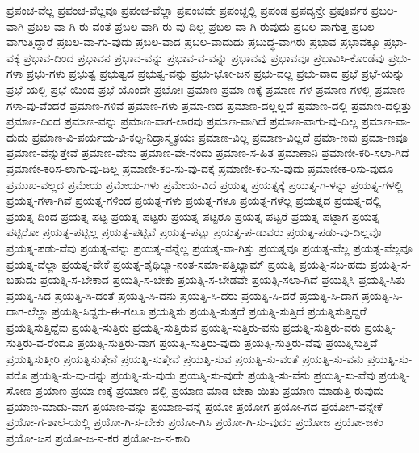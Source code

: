 {ಪ್ರಪಂಚ-ವೆಲ್ಲ
ಪ್ರಪಂಚ-ವೆಲ್ಲವೂ
ಪ್ರಪಂಚ-ವೆಲ್ಲಾ
ಪ್ರಪಂಚವೇ
ಪ್ರಪಂಚ್ದಲ್ಲಿ
ಪ್ರಪಂಡ
ಪ್ರಪದ್ಯನ್ತೇ
ಪ್ರಪೂರ್ವಕ
ಪ್ರಬಲ-ವಾಗಿ
ಪ್ರಬಲ-ವಾ-ಗಿ-ರು-ವಂತೆ
ಪ್ರಬಲ-ವಾಗಿ-ರು-ವು-ದಿಲ್ಲ
ಪ್ರಬಲ-ವಾ-ಗಿ-ರುವುದು
ಪ್ರಬಲ-ವಾಗುತ್ತ
ಪ್ರಬಲ-ವಾಗುತ್ತಿದ್ದಾರೆ
ಪ್ರಬಲ-ವಾ-ಗು-ವುದು
ಪ್ರಬಲ-ವಾದ
ಪ್ರಬಲ-ವಾದುದು
ಪ್ರಬುದ್ಧ-ವಾಗಿರು
ಪ್ರಭಾವ
ಪ್ರಭಾವಕ್ಕೂ
ಪ್ರಭಾ-ವಕ್ಕೆ
ಪ್ರಭಾವ-ದಿಂದ
ಪ್ರಭಾವನ
ಪ್ರಭಾವ-ವನ್ನು
ಪ್ರಭಾವ-ವ-ವನ್ನು
ಪ್ರಭಾವವು
ಪ್ರಭಾವವೂ
ಪ್ರಭಾವಿಸಿ-ಕೊಂಡೆವು
ಪ್ರಭು-ಗಳಾ
ಪ್ರಭು-ಗಳು
ಪ್ರಭುತ್ವ
ಪ್ರಭುತ್ವದ
ಪ್ರಭುತ್ವ-ವನ್ನು
ಪ್ರಭು-ಭೋ-ಜನ
ಪ್ರಭು-ವಲ್ಲ
ಪ್ರಭು-ವಾದ
ಪ್ರಭೆ
ಪ್ರಭೆ-ಯನ್ನು
ಪ್ರಭೆ-ಯಲ್ಲಿ
ಪ್ರಭೆ-ಯಿಂದ
ಪ್ರಭೆ-ಯೊಂದೇ
ಪ್ರಭೋಃ
ಪ್ರಮಾಣ
ಪ್ರಮಾ-ಣಕ್ಕೆ
ಪ್ರಮಾಣ-ಗಳ
ಪ್ರಮಾಣ-ಗಳಲ್ಲಿ
ಪ್ರಮಾಣ-ಗಳಾ-ವು-ವೆಂದರೆ
ಪ್ರಮಾಣ-ಗಳಿವೆ
ಪ್ರಮಾಣ-ಗಳು
ಪ್ರಮಾ-ಣದ
ಪ್ರಮಾಣ-ದಲ್ಲಲ್ಲದೆ
ಪ್ರಮಾಣ-ದಲ್ಲಿ
ಪ್ರಮಾಣ-ದಲ್ಲಿತ್ತು
ಪ್ರಮಾಣ-ದಿಂದ
ಪ್ರಮಾಣ-ವನ್ನು
ಪ್ರಮಾಣ-ವಾಗ-ಲಾರವು
ಪ್ರಮಾಣ-ವಾಗಿದೆ
ಪ್ರಮಾಣ-ವಾಗು-ವು-ದಿಲ್ಲ
ಪ್ರಮಾಣ-ವಾ-ದುದು
ಪ್ರಮಾಣ-ವಿ-ಪರ್ಯಯ-ವಿ-ಕಲ್ಪ-ನಿದ್ರಾಸ್ಮೃತಯಃ
ಪ್ರಮಾಣ-ವಿಲ್ಲ
ಪ್ರಮಾಣ-ವಿಲ್ಲದೆ
ಪ್ರಮಾ-ಣವು
ಪ್ರಮಾ-ಣವೂ
ಪ್ರಮಾಣ-ವೆನ್ನುತ್ತೇವೆ
ಪ್ರಮಾಣ-ವೇನು
ಪ್ರಮಾಣ-ವೇ-ನೆಂದು
ಪ್ರಮಾಣ-ಸ-ಹಿತ
ಪ್ರಮಾಣಾನಿ
ಪ್ರಮಾಣೀ-ಕರಿ-ಸಲಾ-ಗಿದೆ
ಪ್ರಮಾಣೀ-ಕರಿಸ-ಲಾಗು-ವು-ದಿಲ್ಲ
ಪ್ರಮಾಣೀ-ಕರಿ-ಸು-ವು-ದಕ್ಕೆ
ಪ್ರಮಾಣೀ-ಕರಿ-ಸು-ವುದು
ಪ್ರಮಾಣೀಕ-ರಿಸು-ವುದೂ
ಪ್ರಮುಖ-ವಲ್ಲದ
ಪ್ರಮೇಯ
ಪ್ರಮೇಯ-ಗಳು
ಪ್ರಮೇಯ-ವಿದೆ
ಪ್ರಯತ್ನ
ಪ್ರಯತ್ನಕ್ಕೆ
ಪ್ರಯತ್ನ-ಗ-ಳನ್ನು
ಪ್ರಯತ್ನ-ಗಳಲ್ಲಿ
ಪ್ರಯತ್ನ-ಗಳಾ-ಗಿವೆ
ಪ್ರಯತ್ನ-ಗಳಿಂದ
ಪ್ರಯತ್ನ-ಗಳು
ಪ್ರಯತ್ನ-ಗಳೂ
ಪ್ರಯತ್ನ-ಗಳೆಲ್ಲ
ಪ್ರಯತ್ನದ
ಪ್ರಯತ್ನ-ದಲ್ಲಿ
ಪ್ರಯತ್ನ-ದಿಂದ
ಪ್ರಯತ್ನ-ಪಟ್ಟ
ಪ್ರಯತ್ನ-ಪಟ್ಟರು
ಪ್ರಯತ್ನ-ಪಟ್ಟರೂ
ಪ್ರಯತ್ನ-ಪಟ್ಟರೆ
ಪ್ರಯತ್ನ-ಪಟ್ಟಾಗ
ಪ್ರಯತ್ನ-ಪಟ್ಟಿರೋ
ಪ್ರಯತ್ನ-ಪಟ್ಟಿಲ್ಲ
ಪ್ರಯತ್ನ-ಪಟ್ಟಿವೆ
ಪ್ರಯತ್ನ-ಪಟ್ಟು
ಪ್ರಯತ್ನ-ಪ-ಡುವರು
ಪ್ರಯತ್ನ-ಪಡು-ವು-ದಿಲ್ಲವೊ
ಪ್ರಯತ್ನ-ಪಡು-ವೆವು
ಪ್ರಯತ್ನ-ವನ್ನು
ಪ್ರಯತ್ನ-ವನ್ನೆಲ್ಲ
ಪ್ರಯತ್ನ-ವಾ-ಗಿತ್ತು
ಪ್ರಯತ್ನವೂ
ಪ್ರಯತ್ನ-ವೆಲ್ಲ
ಪ್ರಯತ್ನ-ವೆಲ್ಲವೂ
ಪ್ರಯತ್ನ-ವೆಲ್ಲಾ
ಪ್ರಯತ್ನ-ವೇಕೆ
ಪ್ರಯತ್ನ-ಶೈಥಿಲ್ಯಾ-ನಂತ-ಸಮಾ-ಪತ್ತಿಭ್ಯಾಮ್
ಪ್ರಯತ್ನಿ
ಪ್ರಯತ್ನಿ-ಸಬ-ಹದು
ಪ್ರಯತ್ನಿ-ಸ-ಬಹುದು
ಪ್ರಯತ್ನಿ-ಸ-ಬೇಕಾದ
ಪ್ರಯತ್ನಿ-ಸ-ಬೇಕು
ಪ್ರಯತ್ನಿ-ಸ-ಬೇಡವೇ
ಪ್ರಯತ್ನಿ-ಸಲಾ-ಗಿದೆ
ಪ್ರಯತ್ನಿಸಿ
ಪ್ರಯತ್ನಿ-ಸಿತು
ಪ್ರಯತ್ನಿ-ಸಿದ
ಪ್ರಯತ್ನಿ-ಸಿ-ದಂತೆ
ಪ್ರಯತ್ನಿ-ಸಿ-ದನು
ಪ್ರಯತ್ನಿ-ಸಿ-ದರು
ಪ್ರಯತ್ನಿ-ಸಿ-ದರೆ
ಪ್ರಯತ್ನಿ-ಸಿ-ದಾಗ
ಪ್ರಯತ್ನಿ-ಸಿ-ದಾಗ-ಲೆಲ್ಲಾ
ಪ್ರಯತ್ನಿ-ಸಿದ್ದರು-ಈ-ಗಲೂ
ಪ್ರಯತ್ನಿಸು
ಪ್ರಯತ್ನಿ-ಸುತ್ತದೆ
ಪ್ರಯತ್ನಿ-ಸುತ್ತಿದೆ
ಪ್ರಯತ್ನಿಸುತ್ತಿದ್ದರೆ
ಪ್ರಯತ್ನಿಸುತ್ತಿದ್ದೆವು
ಪ್ರಯತ್ನಿ-ಸುತ್ತಿರು
ಪ್ರಯತ್ನಿ-ಸುತ್ತಿರುವ
ಪ್ರಯತ್ನಿ-ಸುತ್ತಿರು-ವನು
ಪ್ರಯತ್ನಿ-ಸುತ್ತಿರು-ವರು
ಪ್ರಯತ್ನಿ-ಸುತ್ತಿರು-ವ-ರೆಂದೂ
ಪ್ರಯತ್ನಿ-ಸುತ್ತಿರು-ವಾಗ
ಪ್ರಯತ್ನಿ-ಸುತ್ತಿರು-ವುದು
ಪ್ರಯತ್ನಿ-ಸುತ್ತಿರು-ವೆವು
ಪ್ರಯತ್ನಿಸುತ್ತಿವೆ
ಪ್ರಯತ್ನಿಸುತ್ತೀರಿ
ಪ್ರಯತ್ನಿಸುತ್ತೇನೆ
ಪ್ರಯತ್ನಿ-ಸುತ್ತೇವೆ
ಪ್ರಯತ್ನಿ-ಸುವ
ಪ್ರಯತ್ನಿ-ಸು-ವಂತೆ
ಪ್ರಯತ್ನಿ-ಸು-ವನು
ಪ್ರಯತ್ನಿ-ಸು-ವರೊ
ಪ್ರಯತ್ನಿ-ಸು-ವು-ದನ್ನು
ಪ್ರಯತ್ನಿ-ಸು-ವುದು
ಪ್ರಯತ್ನಿ-ಸು-ವುದೇ
ಪ್ರಯತ್ನಿ-ಸು-ವೆನು
ಪ್ರಯತ್ನಿ-ಸು-ವೆವು
ಪ್ರಯತ್ನಿ-ಸೋಣ
ಪ್ರಯಾಣ
ಪ್ರಯಾ-ಣಕ್ಕೆ
ಪ್ರಯಾಣ-ದಲ್ಲಿ
ಪ್ರಯಾಣ-ಮಾಡ-ಬೇಕಾ-ಯಿತು
ಪ್ರಯಾಣ-ಮಾಡುತ್ತಿ-ರುವುದು
ಪ್ರಯಾಣ-ಮಾಡು-ವಾಗ
ಪ್ರಯಾಣ-ವನ್ನು
ಪ್ರಯಾಣ-ವನ್ನೆ
ಪ್ರಯೋ
ಪ್ರಯೋಗ
ಪ್ರಯೋ-ಗದ
ಪ್ರಯೋಗ-ವನ್ನೇಕೆ
ಪ್ರಯೋ-ಗ-ಶಾಲೆ-ಯಲ್ಲಿ
ಪ್ರಯೋ-ಗಿ-ಸ-ಬೇಕು
ಪ್ರಯೋ-ಗಿಸಿ
ಪ್ರಯೋ-ಗಿ-ಸು-ವುದರ
ಪ್ರಯೋಜ
ಪ್ರಯೋ-ಜಕಂ
ಪ್ರಯೋ-ಜನ
ಪ್ರಯೋ-ಜ-ನ-ಕರ
ಪ್ರಯೋ-ಜ-ನ-ಕಾರಿ
}
